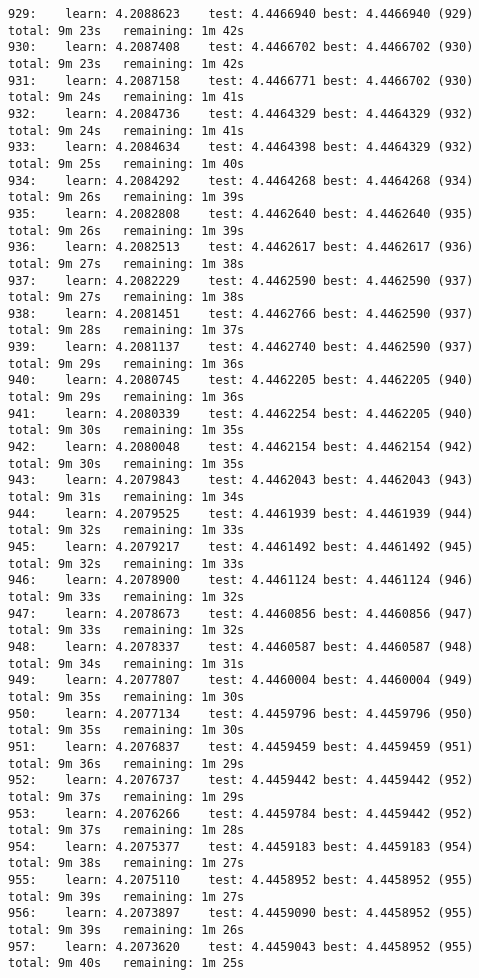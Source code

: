 \documentclass[11pt]{article}
\begin{document}
\begin{Verbatim}[commandchars=\\\{\}]
929:	learn: 4.2088623	test: 4.4466940	best: 4.4466940 (929)	total: 9m 23s	remaining: 1m 42s
930:	learn: 4.2087408	test: 4.4466702	best: 4.4466702 (930)	total: 9m 23s	remaining: 1m 42s
931:	learn: 4.2087158	test: 4.4466771	best: 4.4466702 (930)	total: 9m 24s	remaining: 1m 41s
932:	learn: 4.2084736	test: 4.4464329	best: 4.4464329 (932)	total: 9m 24s	remaining: 1m 41s
933:	learn: 4.2084634	test: 4.4464398	best: 4.4464329 (932)	total: 9m 25s	remaining: 1m 40s
934:	learn: 4.2084292	test: 4.4464268	best: 4.4464268 (934)	total: 9m 26s	remaining: 1m 39s
935:	learn: 4.2082808	test: 4.4462640	best: 4.4462640 (935)	total: 9m 26s	remaining: 1m 39s
936:	learn: 4.2082513	test: 4.4462617	best: 4.4462617 (936)	total: 9m 27s	remaining: 1m 38s
937:	learn: 4.2082229	test: 4.4462590	best: 4.4462590 (937)	total: 9m 27s	remaining: 1m 38s
938:	learn: 4.2081451	test: 4.4462766	best: 4.4462590 (937)	total: 9m 28s	remaining: 1m 37s
939:	learn: 4.2081137	test: 4.4462740	best: 4.4462590 (937)	total: 9m 29s	remaining: 1m 36s
940:	learn: 4.2080745	test: 4.4462205	best: 4.4462205 (940)	total: 9m 29s	remaining: 1m 36s
941:	learn: 4.2080339	test: 4.4462254	best: 4.4462205 (940)	total: 9m 30s	remaining: 1m 35s
942:	learn: 4.2080048	test: 4.4462154	best: 4.4462154 (942)	total: 9m 30s	remaining: 1m 35s
943:	learn: 4.2079843	test: 4.4462043	best: 4.4462043 (943)	total: 9m 31s	remaining: 1m 34s
944:	learn: 4.2079525	test: 4.4461939	best: 4.4461939 (944)	total: 9m 32s	remaining: 1m 33s
945:	learn: 4.2079217	test: 4.4461492	best: 4.4461492 (945)	total: 9m 32s	remaining: 1m 33s
946:	learn: 4.2078900	test: 4.4461124	best: 4.4461124 (946)	total: 9m 33s	remaining: 1m 32s
947:	learn: 4.2078673	test: 4.4460856	best: 4.4460856 (947)	total: 9m 33s	remaining: 1m 32s
948:	learn: 4.2078337	test: 4.4460587	best: 4.4460587 (948)	total: 9m 34s	remaining: 1m 31s
949:	learn: 4.2077807	test: 4.4460004	best: 4.4460004 (949)	total: 9m 35s	remaining: 1m 30s
950:	learn: 4.2077134	test: 4.4459796	best: 4.4459796 (950)	total: 9m 35s	remaining: 1m 30s
951:	learn: 4.2076837	test: 4.4459459	best: 4.4459459 (951)	total: 9m 36s	remaining: 1m 29s
952:	learn: 4.2076737	test: 4.4459442	best: 4.4459442 (952)	total: 9m 37s	remaining: 1m 29s
953:	learn: 4.2076266	test: 4.4459784	best: 4.4459442 (952)	total: 9m 37s	remaining: 1m 28s
954:	learn: 4.2075377	test: 4.4459183	best: 4.4459183 (954)	total: 9m 38s	remaining: 1m 27s
955:	learn: 4.2075110	test: 4.4458952	best: 4.4458952 (955)	total: 9m 39s	remaining: 1m 27s
956:	learn: 4.2073897	test: 4.4459090	best: 4.4458952 (955)	total: 9m 39s	remaining: 1m 26s
957:	learn: 4.2073620	test: 4.4459043	best: 4.4458952 (955)	total: 9m 40s	remaining: 1m 25s

\end{Verbatim}
\end{document}
